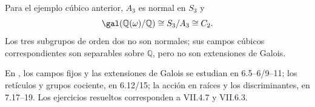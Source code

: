 Para el ejemplo cúbico anterior, $A_3$ es normal en $S_3$ y
\[
\gal(\mathbb Q(\omega)/\mathbb Q)\cong S_3/A_3\cong C_2.
\]
Los tres subgrupos de orden dos no son normales; sus campos cúbicos correspondientes son separables sobre $\mathbb Q$, pero no son extensiones de Galois.

\begin{obs}
En \citet[cap.~VII]{aluffi2009}, los campos fijos y las extensiones de Galois se estudian en 6.5--6/9--11; los retículos y grupos cociente, en 6.12/15; la acción en raíces y los discriminantes, en 7.17--19. Los ejercicios resueltos corresponden a VII.4.7 y VII.6.3.
\end{obs}

